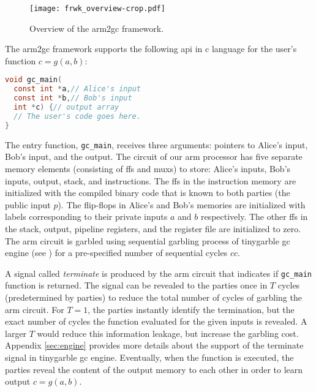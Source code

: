 \begin{figure}[h]
\centering
\texttt{[image: frwk\_overview-crop.pdf]}
\caption{Overview of the \gls{arm2gc} framework.}\label{fig:frwk_overview}
\end{figure}

The \gls{arm2gc} framework supports the following \acrshort{api} in \gls{c} language for the user's function $c = g(a,b)$:
\begin{lstlisting}[language=C,basicstyle=\ttfamily,keywordstyle=\color{blue}\ttfamily,stringstyle=\color{red}\ttfamily,commentstyle=\color{CommentColor}\ttfamily]
void gc_main(
  const int *a,// Alice's input
  const int *b,// Bob's input
  int *c) {// output array
  // The user's code goes here.
}
\end{lstlisting}

The entry function, \texttt{gc\_main}, receives three arguments: pointers to Alice's input, Bob's input, and the output.
The circuit of our \gls{arm} processor has five separate memory elements (consisting of \acrshort{ff}s and \acrshort{mux}s) to store: Alice's inputs, Bob's inputs, output, stack, and instructions.
The \acrshort{ff}s in the instruction memory are initialized with the compiled binary code that is known to both parties (the public input $p$).
The flip-flops in Alice's and Bob's memories are initialized with labels corresponding to their private inputs $a$ and $b$ respectively.
The other \acrshort{ff}s in the stack, output, pipeline registers, and the register file are initialized to zero.
The \gls{arm} circuit is garbled using sequential garbling process of \gls{tinygarble} \acrshort{gc} engine (see ) for a pre-specified number of sequential cycles $cc$.

A signal called \textit{terminate} is produced by the \gls{arm} circuit that indicates if \texttt{gc\_main} function is returned.
The signal can be revealed to the parties once in $T$ cycles (predetermined by parties) to reduce the total number of cycles of garbling the \gls{arm} circuit.
For $T=1$, the parties instantly identify the termination, but the exact number of cycles the function evaluated for the given inputs is revealed.
A larger $T$ would reduce this information leakage, but increase the garbling cost.
Appendix \ref{sec:engine} provides more details about the support of the terminate signal in \gls{tinygarble} \acrshort{gc} engine.
Eventually, when the function is executed, the parties reveal the content of the output memory to each other in order to learn output $c = g(a,b)$.

